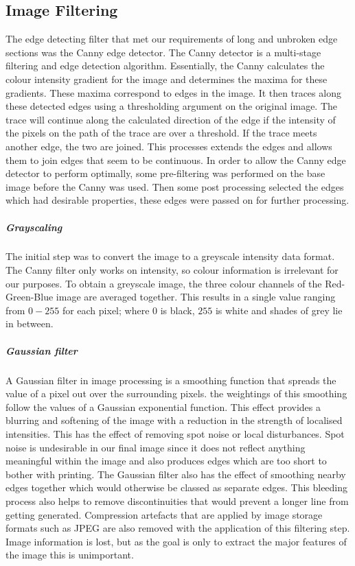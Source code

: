 \subsection{Image Filtering}
The edge detecting filter that met our requirements of long and unbroken edge sections was the Canny edge detector. The Canny detector is a multi-stage filtering and edge detection algorithm. Essentially, the Canny calculates the colour intensity gradient for the image and determines the maxima for these gradients. These maxima correspond to edges in the image. It then traces along these detected edges using a thresholding argument on the original image. The trace will continue along the calculated direction of the edge if the intensity of the pixels on the path of the trace are over a threshold. If the trace meets another edge, the two are joined. This processes extends the edges and allows them to join edges that seem to be continuous.
In order to allow the Canny edge detector to perform optimally, some pre-filtering was performed on the base image before the Canny was used. Then some post processing selected the edges which had desirable properties, these edges were passed on for further processing.
\subparagraph{Grayscaling}
The initial step was to convert the image to a greyscale intensity data format. The Canny filter only works on intensity, so colour information is irrelevant for our purposes. To obtain a greyscale image, the three colour channels of the Red-Green-Blue image are averaged together. This results in a single value ranging from $0-255$ for each pixel; where $0$ is black, $255$ is white and shades of grey lie in between.
\subparagraph{Gaussian filter}
A Gaussian filter in image processing is a smoothing function that spreads the value of a pixel out over the surrounding pixels. the weightings of this smoothing follow the values of a Gaussian exponential function. This effect provides a blurring and softening of the image with a reduction in the strength of localised intensities. This has the effect of removing spot noise or local disturbances. Spot noise is undesirable in our final image since it does not reflect anything meaningful within the image and also produces edges which are too short to bother with printing. The Gaussian filter also has the effect of smoothing nearby edges together which would otherwise be classed as separate edges. This bleeding process also helps to remove discontinuities that would prevent a longer line from getting generated. Compression artefacts that are applied by image storage formats such as JPEG are also removed with the application of this filtering step. Image information is lost, but as the goal is only to extract the major features of the image this is unimportant.
